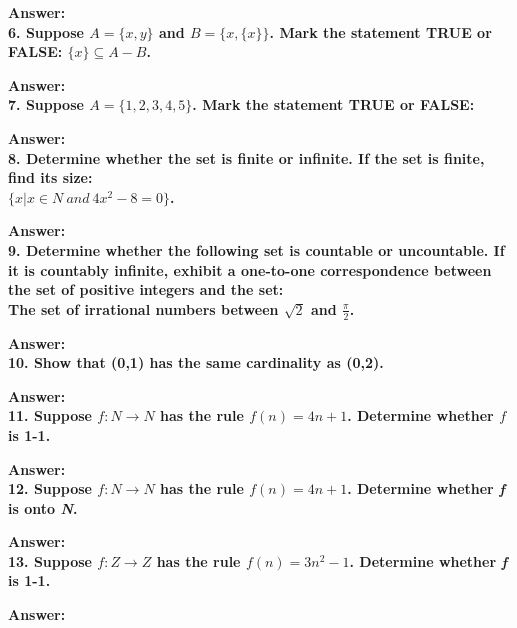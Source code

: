 \documentclass{article}
\begin{document}
\begin{large}
\textbf{Answer:} \\




\textbf{6. Suppose $A=\{x,y\}$ and $B=\{x,\{x\}\}$. Mark the statement TRUE or FALSE: $\{x\}\subseteq A-B$.}

\textbf{Answer:} \\





\textbf{7. Suppose $A=\{1,2,3,4,5\}$. Mark the statement TRUE or FALSE:}

\textbf{Answer:} \\




\textbf{8. Determine whether the set is finite or infinite. If the set is finite, find its size:\\
\indent$\{x|x\in N\ and\ 4{x^{2}}-8=0\}$.}

\textbf{Answer:} \\




\textbf{9. Determine whether the following set is countable or uncountable. If it is countably infinite, exhibit a one-to-one correspondence between the set of positive integers and the set:\\
The set of irrational numbers between $\sqrt{2}$ and $\frac{\pi}{2}$.}

\textbf{Answer:} \\





\textbf{10. Show that (0,1) has the same cardinality as (0,2).}

\textbf{Answer:} \\




\textbf{11. Suppose $f:N\to N$ has the rule $f(n)=4n+1$. Determine whether $f$ is 1-1.}

\textbf{Answer:} \\




\textbf{12. Suppose $f:N\to N$ has the rule $f(n)=4n+1$. Determine whether \emph{f} is onto \emph{N}.}

\textbf{Answer:} \\




\textbf{13. Suppose $f:Z\to Z$ has the rule $f(n)=3{n^{2}}-1$. Determine whether \emph{f} is 1-1.}

\textbf{Answer:} \\





\end{large}
\end{document}
